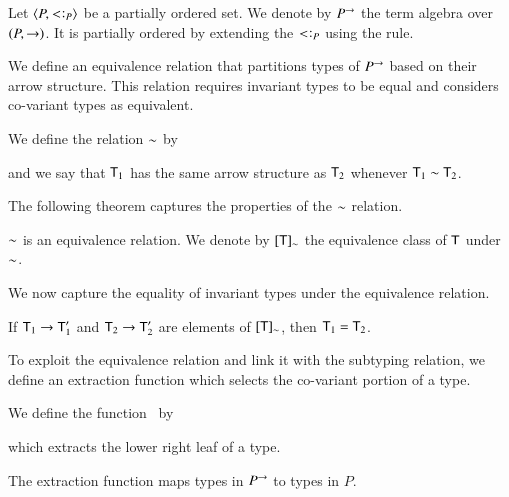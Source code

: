 \documentclass{report}
\begin{document}
  \begin{dfn}
    Let $\poset{P,\subtype_P}$ be a partially ordered set. We denote by $P^\rightarrow$ the term
    algebra over $(P,\rightarrow)$. It is partially ordered by extending the $\subtype_P$ using
    the \sfun rule.
  \end{dfn}
  We define an equivalence relation that partitions types of $P^\rightarrow$
  based on their arrow structure. This relation
  requires invariant types to be equal and considers co-variant types
  as equivalent.
  \begin{dfn}
    We define the relation $\sim$ by
    and we say that $\textsf{T}_1$ has the same arrow structure as $\textsf{T}_2$ whenever
    $\textsf{T}_1\sim\textsf{T}_2$.
  \end{dfn}
  The following theorem captures the properties of the $\sim$ relation.
  \begin{thm}
    $\sim$ is an equivalence relation. We denote by $\lbrack\textsf{T}\rbrack_\sim$ the
    equivalence class of $\textsf{T}$ under $\sim$.
  \end{thm}
  We now capture the equality of invariant types under the equivalence relation.
  \begin{thm}
    If $\textsf{T}_1\rightarrow\textsf{T}_1'$ and $\textsf{T}_2\rightarrow\textsf{T}_2'$ are elements of $\lbrack\textsf{T}\rbrack_\sim$,
    then $\textsf{T}_1=\textsf{T}_2$.
  \end{thm}
  To exploit the equivalence relation and link it with the subtyping relation,
  we define an extraction function which selects the co-variant portion of a type.
  \begin{dfn}
    We define the function \extract\ by
    which extracts the lower right leaf of a type.
  \end{dfn}
  The extraction function maps types in $P^\rightarrow$ to types in $P$.
\end{document}
